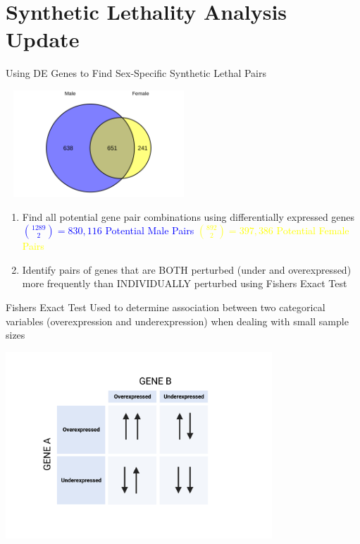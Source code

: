 \documentclass{beamer}
\begin{document}
	\section{Synthetic Lethality Analysis Update}
	\begin{frame}{Using DE Genes to Find Sex-Specific Synthetic Lethal Pairs}
		\begin{center}
			\includegraphics[width=7cm, height=4cm]{all_cancersvenndiagram_malede_vs_femalede_0.9.png}
		\end{center}
		\begin{enumerate}
			\item Find all potential gene pair combinations using differentially expressed genes \newline	
			\textcolor{blue}{${1289 \choose 2 } = 830,116$ Potential Male Pairs \newline}
			\textcolor{yellow}{${892 \choose 2 } = 397,386$ Potential Female Pairs}
			
			\item Identify pairs of genes that are BOTH perturbed (under and overexpressed) more frequently than INDIVIDUALLY perturbed using Fishers Exact Test
		\end{enumerate}
	\end{frame}

	\begin{frame}{Fishers Exact Test}
		Used to determine association between two categorical variables (overexpression and underexpression) when dealing with small sample sizes
		\begin{center}
		\includegraphics[width=10cm, height=7cm]{Contingency.png}
		\end{center}
	\end{frame}
\end{document}
